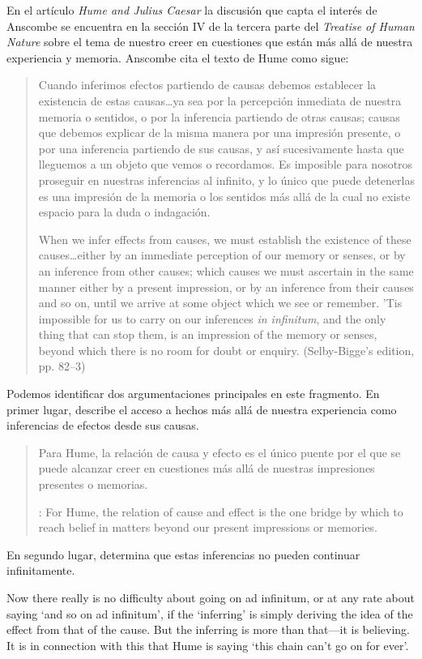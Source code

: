 En el artículo \emph{Hume and Julius Caesar} la discusión que capta el interés
de Anscombe se encuentra en la sección IV de la tercera parte del \emph{Treatise
of Human Nature} sobre el tema de nuestro creer en cuestiones que están más allá
de nuestra experiencia y memoria. Anscombe cita el texto de Hume como sigue:

\blockquote[{\cite[86]{anscombe1981hjc}}When we infer effects from causes, we
must establish the existence of these causes\ldots either by an immediate
perception of our memory or senses, or by an inference from other causes; which
causes we must ascertain in the same manner either by a present impression, or
by an inference from their causes and so on, until we arrive at some object
which we see or remember. 'Tis impossible for us to carry on our inferences
\emph{in infinitum}, and the only thing that can stop them, is an impression of
the memory or senses, beyond which there is no room for doubt or enquiry.
(Selby-Bigge's edition, pp. 82--3)]{Cuando inferimos efectos partiendo de causas
  debemos establecer la existencia de estas causas\ldots ya sea por la
  percepción inmediata de nuestra memoria o sentidos, o por la inferencia
  partiendo de otras causas; causas que debemos explicar de la misma manera por
  una impresión presente, o por una inferencia partiendo de sus causas, y así
  sucesivamente hasta que lleguemos a un objeto que vemos o recordamos. Es
  imposible para nosotros proseguir en nuestras inferencias al infinito, y lo
  único que puede detenerlas es una impresión de la memoria o los sentidos más
  allá de la cual no existe espacio para la duda o indagación.}

Podemos identificar dos argumentaciones principales en este fragmento. En primer
lugar, describe el acceso a hechos más allá de nuestra experiencia como
inferencias de efectos desde sus causas.
\blockquote[{\cite[87]{anscombe1981hjc}}: For Hume, the relation of cause and
effect is the one bridge by which to reach belief in matters beyond our present
impressions or memories.]{Para Hume, la relación de causa y efecto es el único
  puente por el que se puede alcanzar creer en cuestiones más allá de nuestras
  impresiones presentes o memorias.}

En segundo lugar, determina que estas inferencias no pueden continuar
infinitamente.

Now there really is no difficulty about going on ad infinitum, or at any rate
about saying ‘and so on ad infinitum’, if the ‘inferring’ is simply deriving the
idea of the effect from that of the cause. But the inferring is more than
that—it is believing. It is in connection with this that Hume is saying ‘this
chain can’t go on for ever’.
